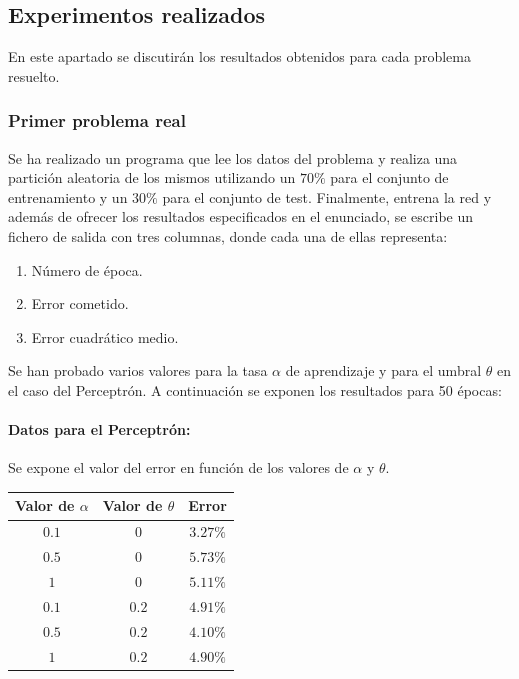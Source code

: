 \documentclass[spanish]{assignment}
\begin{document}
	
	\newpage
	\subsection{Experimentos realizados}
	En este apartado se discutirán los resultados obtenidos para cada problema resuelto.
	\subsubsection{Primer problema real}
	Se ha realizado un programa que lee los datos del problema y realiza una partición aleatoria de los mismos utilizando un $70\%$ para el conjunto de entrenamiento y un $30\%$ para el conjunto de test. Finalmente, entrena la red y además de ofrecer los resultados especificados en el enunciado, se escribe un fichero de salida con tres columnas, donde cada una de ellas representa:
	\begin{enumerate}
		\item Número de época.
		\item Error cometido.
		\item Error cuadrático medio.
	\end{enumerate}
	
	Se han probado varios valores para la tasa $\alpha$ de aprendizaje y para el umbral $\theta$ en el caso del Perceptrón. 
	A continuación se exponen los resultados para 50 épocas:
	
	\paragraph{Datos para el Perceptrón:} Se expone el valor del error en función de los valores de $\alpha$ y $\theta$.
	\begin{center}
		\begin{tabular}{|c|c|c|}
			\hline
			\textbf{Valor de $\alpha$} & \textbf{Valor de $\theta$} & \textbf{Error}\\
			\hline
			$0.1$ & $0$ & $3.27\%$\\
			$0.5$ & $0$ & $5.73\%$\\
			$1$ & $0$ &  $5.11\%$\\
			\hhline{|=|=|=|}
			$0.1$ & $0.2$ & $4.91\%$\\
			$0.5$ & $0.2$ & $4.10\%$\\
			$1$ & $0.2$ &  $4.90\%$\\
			\hline
		\end{tabular}
	\end{center}
\end{document}
